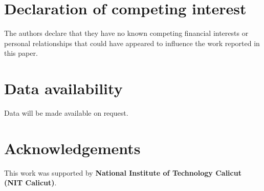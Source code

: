 \documentclass[12pt]{article}
\begin{document}
	
	\section*{Declaration of competing interest}
	The authors declare that they have no known competing financial interests or personal relationships 
	that could have appeared to influence the work reported in this paper.
	
	\section*{Data availability}
	Data will be made available on request.
	
	\section*{Acknowledgements}
	This work was supported by \textbf{National Institute of Technology Calicut (NIT Calicut)}.
	
	
	\appendix
	

	
	
	
	
\end{document}
